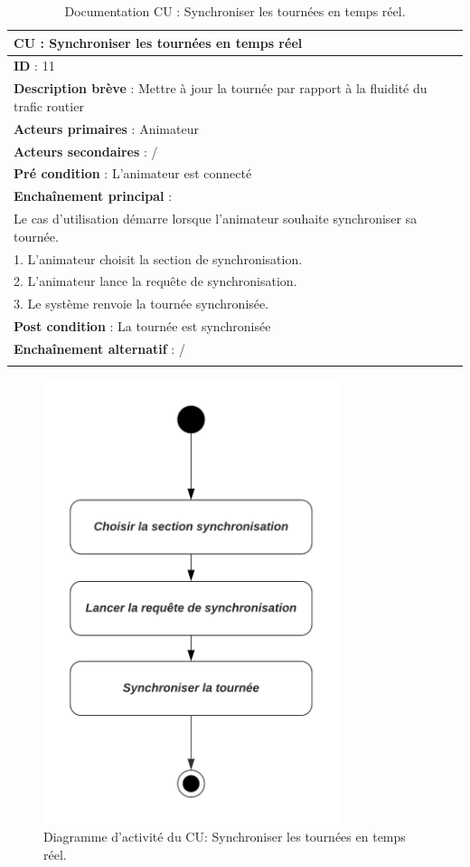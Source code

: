 \renewcommand{\arraystretch}{1.5}
\begin{xltabular}{\linewidth}{|X|}
    \hline
    \textbf{CU} : Synchroniser les tournées en temps réel     \\\hline
    \textbf{ID} :  11    \\\hline
    \textbf{Description brève} :  Mettre à jour la tournée par rapport à la fluidité du trafic routier    \\\hline
    \textbf{Acteurs primaires} :  Animateur    \\\hline
    \textbf{Acteurs secondaires} :   /   \\\hline
    \textbf{Pré condition} :   L'animateur est connecté   \\\hline
    \textbf{Enchaînement principal} :   \\
    Le cas d'utilisation démarre lorsque l'animateur souhaite synchroniser sa tournée.\\
    1. L'animateur choisit la section de synchronisation.\\
    2. L'animateur lance la requête de synchronisation.\\
    3. Le système renvoie la tournée synchronisée.
    \\\hline
    \textbf{Post condition} :  La tournée est synchronisée    \\\hline
    \textbf{Enchaînement alternatif} :  /    \\\hline
    
    \caption{Documentation CU : Synchroniser les tournées en temps réel.}
    \label{tab:cu-specs5}
\end{xltabular}
\FloatBarrier

\begin{figure}[hbt!]
  \centering
  \includegraphics[height=13cm]{images_pfe/SYNC_TOUR_DIAGRAM.png}
  \caption{Diagramme d'activité du CU: Synchroniser les tournées en temps réel.}
  \label{fig:activity-animator}
\end{figure}
\FloatBarrier


